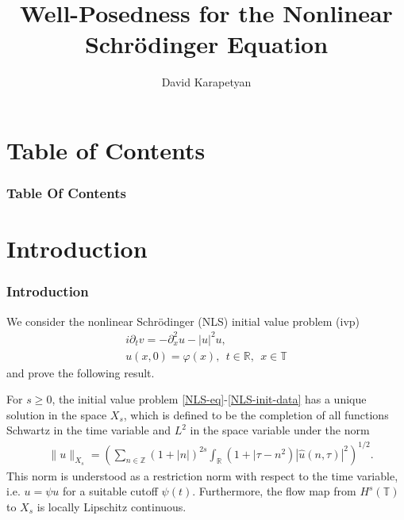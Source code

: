 \documentclass[handout]{beamer}
\date{}
\title{ Well-Posedness for the Nonlinear Schr\"{o}dinger Equation  }
\author{David Karapetyan}
\institute{Notre Dame}
\numberwithin{equation}{section}
\newcommand{\rr}{\mathbb{R}}
\newcommand{\p}{\partial}
\newcommand{\zz}{\mathbb{Z}}
\newcommand{\ci}{\mathbb{T}}
\newcommand{\wh}{\widehat}
\newcommand{\vp}{\varphi}
\begin{document}
\begin{frame}
	\titlepage
\end{frame}


\section*{Table of Contents}
\setcounter{section}{0}
\begin{frame}
		\frametitle{Table Of Contents}
			\tableofcontents
		\end{frame}

		\section{Introduction}
		\begin{frame}
			\frametitle{Introduction}
We consider the nonlinear Schr\"{o}dinger (NLS) 
				  initial value problem (ivp)
%
%
\begin{gather}
	\label{NLS-eq}
	i \p_t v = - \p_x^{2} u - |u|^2 u,
		\\
		\label{NLS-init-data}
		u(x,0) = \vp(x), \ \ t \in \rr, \ \ x \in \ci
\end{gather}
%
%
and prove the following result.
\end{frame}


\begin{frame}
%
%
%
%
%
%
%
%
%
%
\begin{theorem}
	\label{thm:main}
	For $s\ge 0$, the initial value problem 
	\eqref{NLS-eq}-\eqref{NLS-init-data} has a unique solution in the space   
	$X_s$, which is defined to be the completion of 
	all functions Schwartz in the time variable and $L^2$ in the space 
	variable under the norm
%
%
%
%
\begin{equation}
	\label{X_s-norm}
	\begin{split}
		& \|u\|_{X_s}
		= \left( \sum_{n\in \zz} \left(1 + |n| \right)^{2s} \int_\rr \left( 1 + | 
		\tau - n^{2 } \right ) | \wh{u}(n, \tau) |^2
		\right )^{1/2}.
	\end{split}
\end{equation}
%
%
This norm is understood as a restriction norm with respect to the time 
variable, i.e. $u = \psi u$ for a suitable cutoff $\psi(t)$. Furthermore, the 
flow map from $H^s(\ci)$ to $X_s$ is locally Lipschitz continuous. 
%
%
\end{theorem} 

\end{frame}
\end{document}
